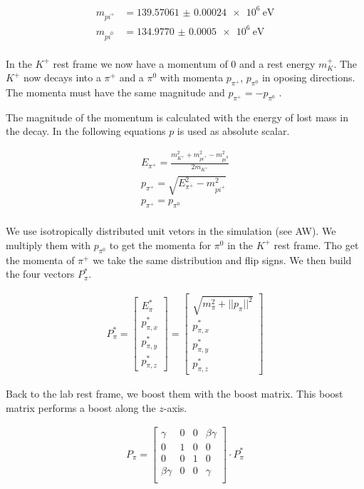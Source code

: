 \documentclass[12pt,a4paper,oneside,english]{article}
\begin{document}
	\begin{align*}
		m_{pi^+ } &=\SI{139.57061(24)e6}{\electronvolt}\\
		m_{pi^0 } &=\SI{134.9770(5)e6}{\electronvolt}\\
	\end{align*}
	
	In the $K^+$ rest frame we now have a momentum of $0$ and a rest energy $m_K^+$. The $K^+$ now decays into a $\pi^+$ and a $\pi^0$ with momenta $p_{\pi^+} $, $p_{\pi^0} $ in oposing directions. The momenta must have the same magnitude and $p_{\pi^+} = -p_{\pi^0} $ .
	
	The magnitude of the momentum is calculated with  the energy of lost mass in the decay. In the following equations $p$ is used as absolute scalar.
		
	\begin{align}
		E_{\pi^+} = \frac{m_{K^+}^2 + m_{pi^+ }^2 - m_{pi^0 }^2 } {2 m_{K^+}}\\
		p_{\pi^+} = \sqrt{E_{\pi^+}^2 - m_{pi^+ }^2 }\\
		p_{\pi^+ } = p_{\pi^0 }\\
	\end{align}

	
	We use isotropically distributed unit vetors in the simulation (see AW). We multiply them with $p_{\pi^0}$ to get the momenta for $\pi^0$ in the $K^+$ rest frame. Tho get the momenta of $\pi^+$ we take the same distribution and flip signs. We then build the four vectors  $P^*_{\pi}$.
	
	\begin{align}
		 P^*_{\pi} = 
		\begin{bmatrix}
				E_{\pi}^* \\ p_{\pi,x}^* \\ p_{\pi,y}^* \\ p_{\pi,z}^*
		\end{bmatrix} = 
		\begin{bmatrix}
				\sqrt{m_{\pi}^2 + ||p_{\pi}||^2 } \\ p_{\pi,x}^* \\ p_{\pi,y}^* \\ p_{\pi,z}^*
		\end{bmatrix}
	\end{align}
	
	Back to the lab rest frame, we boost them with the boost matrix. This boost matrix performs a boost along the $z$-axis. 
	
	\begin{align}
		P_{\pi} =
		\begin{bmatrix}
		\gamma & 0 & 0 & \beta \gamma \\
		0 & 1 & 0 & 0 \\
		0 & 0 & 1 & 0\\
		\beta \gamma & 0 & 0 & \gamma \\
		\end{bmatrix}
		\cdot
		P^*_{\pi}
	\end{align}
	
\end{document}

